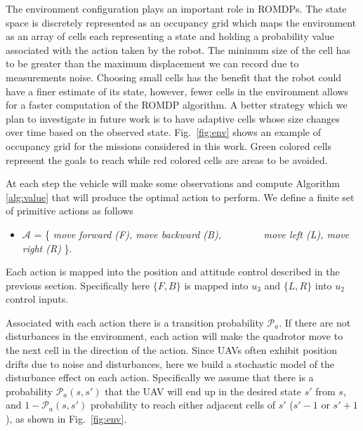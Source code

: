 The environment configuration plays an important role in ROMDPs.
The state space is discretely represented as an occupancy grid which maps the environment as an array of cells each representing a state and holding a probability value associated with the action taken by the robot. The minimum size of the cell has to be greater than the maximum displacement we can record due to measurements noise. 
Choosing small cells has the benefit that the robot could have a finer estimate of its state, however, fewer cells in the environment allows for a faster computation of the ROMDP algorithm.
A better strategy which we plan to investigate in future work is to have adaptive cells whose size changes over time based on the observed state.
Fig.~\ref{fig:env} shows an example of occupancy grid for the missions considered in this work. Green colored cells represent the goals to reach while red colored cells are areas to be avoided. 

At each step the vehicle will make some observations and compute Algorithm \ref{alg:value} that will produce the optimal action to perform. We define a finite set of primitive actions as follows

\begin{itemize}
\item{$\mathcal A$ = \{ {\em{move forward (F), move backward (B), $\; \; \; \; \; \; \; \; \; \; \; \; \; $ move left (L), move right (R)}} \}.}
\end{itemize}
Each action is mapped into the position and attitude control described in the previous section. Specifically here $\{F,B\}$ is mapped into $u_3$ and $\{L,R\}$ into $u_2$ control inputs.

Associated with each action there is a transition probability $\mathcal P_a$. If there are not disturbances in the environment, each action will make the quadrotor move to the next cell in the direction of the action. Since UAVs often exhibit position drifts due to noise and disturbances, here we build a stochastic model of the disturbance effect on each action. Specifically we assume that there is a probability $\mathcal P_a(s,s')$ that the UAV will end up in the desired state $s'$ from $s$, and $1-\mathcal P_a(s,s')$ probability to reach either adjacent cells of $s'$ ($s'\!-\!1$ or $s'\!+\!1$), as shown in Fig.~\ref{fig:env}.

